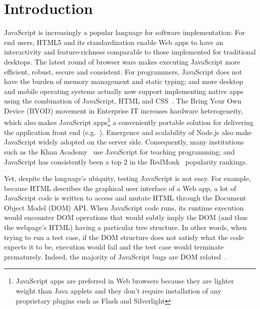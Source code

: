 \section{Introduction}
JavaScript is increasingly a popular language for software implementation: %
For end users, HTML5 and its standardization enable Web apps to have an interactivity and feature-richness comparable to those implemented for traditional desktops.  
The latest round of browser wars makes executing JavaScript more efficient, robust, secure and consistent.  
For programmers, JavaScript does not have the burden of memory management and static typing; and more desktop and mobile operating systems actually now support implementing native apps using the combination of JavaScript, HTML and CSS~\cite{jalangi}.
The Bring Your Own Device (BYOD) movement in Enterprise IT increases hardware heterogeneity, which also makes JavaScript apps\footnote{JavaScript apps are preferred in Web browsers because they are lighter weight than Java applets and they don't require installation of any proprietary plugins such as Flash and Silverlight} a conveniently portable solution for delivering the application front end (e.g.~\cite{BNSFoffice365}).
Emergence and scalability of Node.js also make JavaScript widely adopted on the server side.
Consequently, many institutions such as the Khan Academy~\cite{khanAcademy} use JavaScript for teaching programming; and JavaScript has consistently been a top 2 in the RedMonk~\cite{redmonk} popularity rankings.%

Yet, despite the language's ubiquity, testing JavaScript is not easy.
For example, because HTML describes the graphical user interface of a Web app, a lot of JavaScript code is written to access and mutate HTML through the Document Object Model (DOM) API.  
When JavaScript code runs, its runtime execution would encounter DOM operations that would subtly imply the DOM (and thus the webpage's HTML) having a particular tree structure.
In other words, when trying to run a test case, if the DOM structure does not satisfy what the code expects it to be, execution would fail and the test case would terminate prematurely.  Indeed, the majority of JavaScript bugs are DOM related~\cite{frolin2013}.

